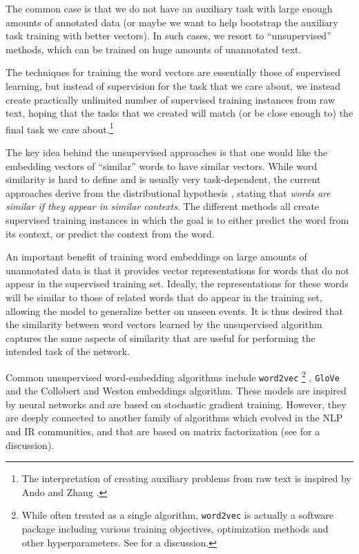 \documentclass[jair,twoside,11pt,theapa]{article}
\newcommand{\ygcomment}[1]{\textbf{[TODO: #1]}}
\renewcommand{\ygcomment}[1]{}
\renewcommand{\shortcite}[0]{\citeyear}
\begin{document}
{The common case is that we do not have an auxiliary task with large enough
amounts of annotated data (or maybe we want to help bootstrap the auxiliary task
training with better vectors). In such cases, we resort to ``unsupervised''
methods, which can be trained on huge amounts of unannotated text.  

The techniques for training the word vectors are essentially those of supervised
learning, but instead of supervision for the task that we care about, we instead
create practically unlimited number of supervised training instances from raw
text, hoping that the tasks that we created will match (or be close enough to) the
final task we care about.\footnote{The interpretation of creating auxiliary problems from
raw text is inspired by Ando and Zhang \cite{ando2005highperformance,ando2005framework}.}

The key idea behind the unsupervised approaches is that one would like the
embedding vectors of ``similar'' words to have similar vectors. While word
similarity is hard to define and is usually very task-dependent, the current
approaches derive from the distributional hypothesis \cite{harris1954distributional},
stating that \emph{words are similar if they appear in similar contexts}. The different
methods all create supervised training instances in which the goal is to either
predict the word from its context, or predict the context from the word.

An important benefit of training word embeddings on large amounts of unannotated
data is that it provides vector representations for words that do not appear in
the supervised training set.  Ideally, the representations for these words will
be similar to those of related words that do appear in the training set,
allowing the model to generalize better on unseen events.  It is thus desired
that
the similarity between word vectors learned by the unsupervised algorithm
captures the same aspects of similarity that are useful for performing the
intended task of the network.
\ygcomment{Improve: discuss changes, why do we even expect this to
work?}

Common unsupervised word-embedding algorithms include \texttt{word2vec}
\footnote{While often treated as a single algorithm, \texttt{word2vec} is
actually a software package including various training objectives, optimization
methods and other hyperparameters. See \cite{rong2014word2vec,levy2015improving} for a discussion.}
\cite{mikolov2013distributed,mikolov2013efficient}, \texttt{GloVe} \cite{pennington2014glove} and the Collobert and Weston
\shortcite{collobert2008unified,collobert2011natural} embeddings algorithm.  These models are inspired by neural
networks and are based on stochastic gradient training.  However, they are
deeply connected to another family of algorithms which evolved in the NLP and IR
communities, and that are based on matrix factorization (see \cite{levy2014neural,levy2015improving}
for a discussion).

}
\end{document}
